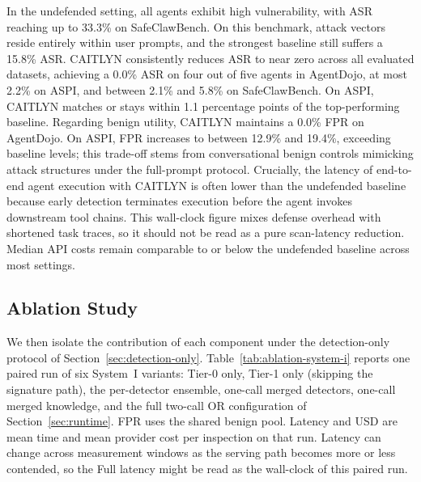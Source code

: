 In the undefended setting, all agents exhibit high vulnerability, with
ASR reaching up to 33.3\% on SafeClawBench. On this benchmark, attack
vectors reside entirely within user prompts, and the strongest
baseline still suffers a 15.8\% ASR. CAITLYN consistently reduces ASR
to near zero across all evaluated datasets, achieving a 0.0\% ASR on
four out of five agents in AgentDojo, at most 2.2\% on ASPI, and
between 2.1\% and 5.8\% on SafeClawBench. On ASPI, CAITLYN matches or
stays within 1.1 percentage points of the top-performing
baseline. Regarding benign utility, CAITLYN maintains a 0.0\% FPR on
AgentDojo. On ASPI, FPR increases to between 12.9\% and 19.4\%,
exceeding baseline levels; this trade-off stems from conversational
benign controls mimicking attack structures under the full-prompt
protocol. Crucially, the latency of end-to-end agent execution with
CAITLYN is often lower than the undefended baseline because early
detection terminates execution before the agent invokes downstream
tool chains. This wall-clock figure mixes defense overhead with
shortened task traces, so it should not be read as a pure
scan-latency reduction. Median API costs remain comparable to or below the
undefended baseline across most settings.


\subsection{Ablation Study}
\label{sec:ablation}



We then isolate the contribution of each component under the
detection-only protocol of Section~\ref{sec:detection-only}.
Table~\ref{tab:ablation-system-i} reports one paired run of six
System~I variants: Tier-0 only, Tier-1 only (skipping the signature
path), the per-detector ensemble, one-call merged detectors, one-call
merged knowledge, and the full two-call OR configuration of
Section~\ref{sec:runtime}. FPR uses the
shared benign pool. Latency and USD are mean time and mean
provider cost per inspection on that run. Latency can
change across measurement windows as the serving path becomes more
or less contended, so the Full latency might be read as the
wall-clock of this paired run.




